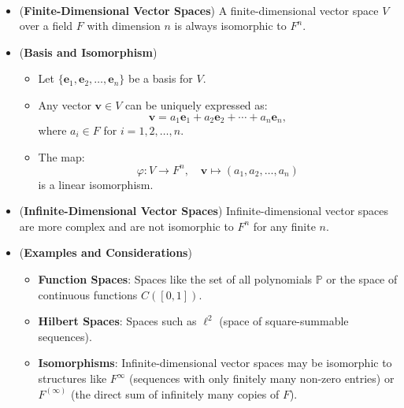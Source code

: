 \begin{remark}[\bf Dimension]
\ \begin{itemize}
	\item (\textbf{Finite-Dimensional Vector Spaces}) A finite-dimensional vector space \( V \) over a field \( F \) with dimension \( n \) is always isomorphic to \( F^n \).
	\item (\textbf{Basis and Isomorphism}) \begin{itemize}
		\item Let \( \{\mathbf{e}_1, \mathbf{e}_2, \ldots, \mathbf{e}_n\} \) be a basis for \( V \).
		\item Any vector \( \mathbf{v} \in V \) can be uniquely expressed as:
		\[
		\mathbf{v} = a_1 \mathbf{e}_1 + a_2 \mathbf{e}_2 + \cdots + a_n \mathbf{e}_n,
		\]
		where \( a_i \in F \) for \( i = 1, 2, \ldots, n \).
		\item The map:
		\[
		\varphi : V \to F^n, \quad \mathbf{v} \mapsto (a_1, a_2, \ldots, a_n)
		\]
		is a linear isomorphism.
	\end{itemize}
	\item (\textbf{Infinite-Dimensional Vector Spaces}) Infinite-dimensional vector spaces are more complex and are not isomorphic to \( F^n \) for any finite \( n \).
	\item (\textbf{Examples and Considerations}) \begin{itemize}
		\item \textbf{Function Spaces}: Spaces like the set of all polynomials \( \mathbb{P} \) or the space of continuous functions \( C([0, 1]) \).
		\item \textbf{Hilbert Spaces}: Spaces such as \( \ell^2 \) (space of square-summable sequences).
		\item \textbf{Isomorphisms}: Infinite-dimensional vector spaces may be isomorphic to structures like \( F^\infty \) (sequences with only finitely many non-zero entries) or \( F^{(\infty)} \) (the direct sum of infinitely many copies of \( F \)).
	\end{itemize}
\end{itemize}
\end{remark}


